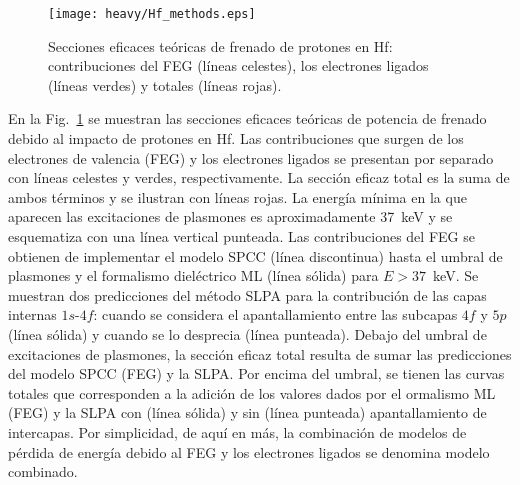 \begin{figure}[t]
\centering
\texttt{[image: heavy/Hf\_methods.eps]}
\caption[Secciones eficaces teóricas de frenado de protones en Hf.]
{Secciones eficaces teóricas de frenado de protones en Hf: 
contribuciones del FEG (líneas celestes), los electrones ligados 
(líneas verdes) y totales (líneas rojas).} 
\label{fig:Hf_methods}
\end{figure}

En la Fig.~\ref{fig:Hf_methods} se muestran las secciones eficaces 
teóricas de potencia de frenado debido al impacto de protones en Hf. 
Las contribuciones que surgen de los electrones de valencia (FEG) y los
electrones ligados se presentan por separado con líneas celestes y 
verdes, respectivamente. La sección eficaz total es la suma de ambos 
términos y se ilustran con líneas rojas. La energía mínima en la que 
aparecen las excitaciones de plasmones es aproximadamente 37~keV y se 
esquematiza con una línea vertical punteada. Las contribuciones del FEG 
se obtienen de implementar el modelo SPCC (línea discontinua) hasta el 
umbral de plasmones y el formalismo dieléctrico ML (línea sólida) para 
$E>37$~keV. Se muestran dos predicciones del método SLPA para la 
contribución de las capas internas $1s$-$4f$: cuando se considera el 
apantallamiento entre las subcapas $4f$ y $5p$ (línea sólida) y cuando 
se lo desprecia (línea punteada). Debajo del umbral de excitaciones de 
plasmones, la sección eficaz total resulta de sumar las predicciones del 
modelo SPCC (FEG) y la SLPA. Por encima del umbral, se tienen las curvas 
totales que corresponden a la adición de los valores dados por el 
ormalismo ML (FEG) y la SLPA con (línea sólida) y sin (línea punteada) 
apantallamiento de intercapas. Por simplicidad, de aquí en más, la 
combinación de modelos de pérdida de energía debido al FEG y los 
electrones ligados se denomina modelo combinado.

